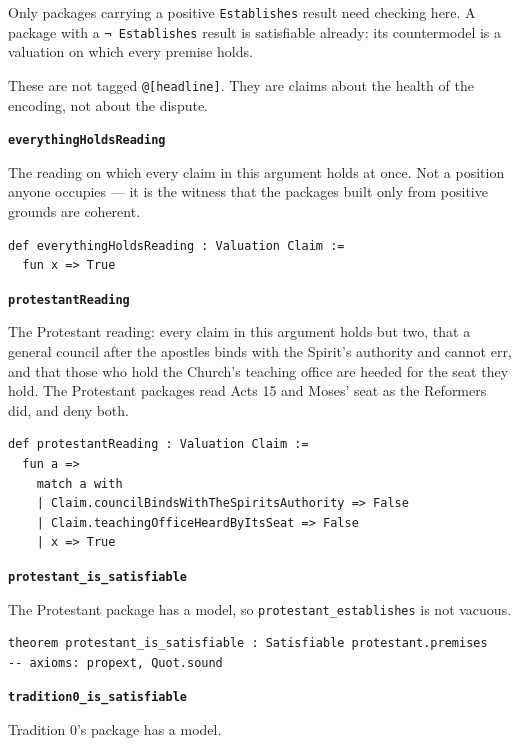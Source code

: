\documentclass[11pt]{article}
\begin{document}
Only packages carrying a positive \texttt{Establishes} result need checking here. A package with a \texttt{¬ Establishes} result is satisfiable already: its countermodel is a valuation on which every premise holds.

These are not tagged \texttt{@[headline]}. They are claims about the health of the encoding, not about the dispute.

\par\medskip\noindent\textbf{\texttt{everything\allowbreak{}Holds\allowbreak{}Reading}}\par\nobreak\noindent
The reading on which every claim in this argument holds at once. Not a position anyone occupies — it is the witness that the packages built only from positive grounds are coherent.

{\small\begin{verbatim}
def everythingHoldsReading : Valuation Claim :=
  fun x => True
\end{verbatim}}
\par\medskip\noindent\textbf{\texttt{protestant\allowbreak{}Reading}}\par\nobreak\noindent
The Protestant reading: every claim in this argument holds but two, that a general council after the apostles binds with the Spirit’s authority and cannot err, and that those who hold the Church’s teaching office are heeded for the seat they hold. The Protestant packages read Acts 15 and Moses’ seat as the Reformers did, and deny both.

{\small\begin{verbatim}
def protestantReading : Valuation Claim :=
  fun a =>
    match a with
    | Claim.councilBindsWithTheSpiritsAuthority => False
    | Claim.teachingOfficeHeardByItsSeat => False
    | x => True
\end{verbatim}}
\par\medskip\noindent\textbf{\texttt{protestant\_\allowbreak{}is\_\allowbreak{}satisfiable}}\par\nobreak\noindent
The Protestant package has a model, so \texttt{protestant\_\allowbreak{}establishes} is not vacuous.

{\small\begin{verbatim}
theorem protestant_is_satisfiable : Satisfiable protestant.premises
-- axioms: propext, Quot.sound
\end{verbatim}}
\par\medskip\noindent\textbf{\texttt{tradition0\_\allowbreak{}is\_\allowbreak{}satisfiable}}\par\nobreak\noindent
Tradition 0’s package has a model.
\end{document}
